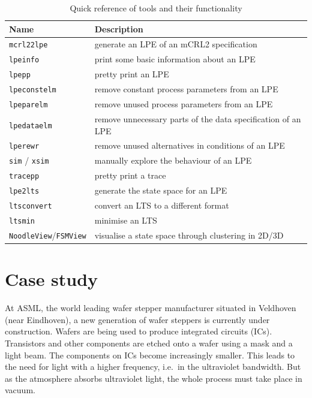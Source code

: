 \documentclass[a4paper,fleqn]{article}
\begin{document}
\begin{table}[H]
\begin{center}
\begin{tabular}{|l|l|}
\hline
\textbf{Name}             & \textbf{Description}\\
\hline
\texttt{mcrl22lpe}                   & generate an LPE of an mCRL2 specification \\
\hline
\texttt{lpeinfo}                     & print some basic information about an LPE \\
\texttt{lpepp}                       & pretty print an LPE\\
\texttt{lpeconstelm}                 & remove constant process parameters from an LPE \\
\texttt{lpeparelm}                   & remove unused process parameters from an LPE \\
\texttt{lpedataelm}                  & remove unnecessary parts of the data specification of an LPE \\
\texttt{lperewr}                     & remove unused alternatives in conditions of an LPE\\
\hline
\texttt{sim} / \texttt{xsim}         & manually explore the behaviour of an LPE \\
\texttt{tracepp}                     & pretty print a trace \\
\hline
\texttt{lpe2lts}                     & generate the state space for an LPE \\
\texttt{ltsconvert}                  & convert an LTS to a different format \\
\texttt{ltsmin}                      & minimise an LTS \\
\hline
\texttt{NoodleView}/\texttt{FSMView} & visualise a state space through clustering in 2D/3D\\
\hline
\end{tabular}
\end{center}
\caption{Quick reference of tools and their functionality}
\label{tab:toolref}
\end{table}

\section{Case study}
\label{subsec:case}
At ASML, the world leading wafer stepper manufacturer situated in Veldhoven
(near Eindhoven), a new generation of wafer steppers is currently under
construction. Wafers are being used to produce integrated circuits (ICs).
Transistors and other components are etched onto a wafer using a mask and
a light beam. The components on ICs become increasingly smaller. This leads to the
need for light with a higher frequency, i.e.\ in the ultraviolet bandwidth.  But
as the atmosphere absorbs ultraviolet light, the whole process must take place
in vacuum.
\end{document}
